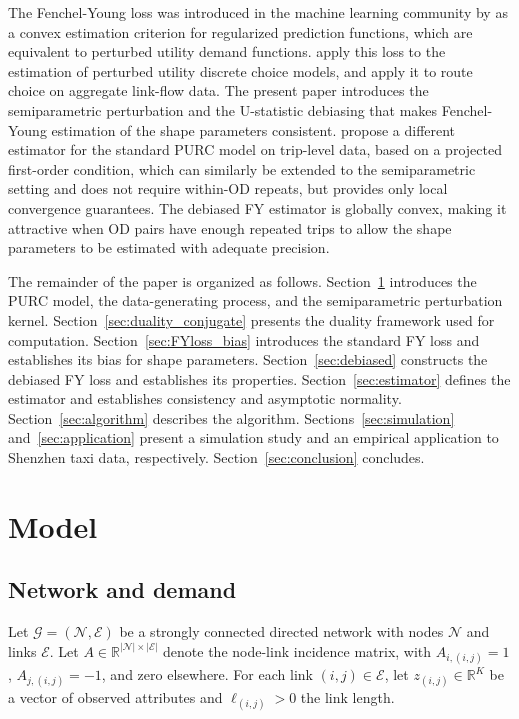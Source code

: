 \documentclass[12pt]{article}
\newcommand{\cG}{\mathcal{G}}
\newcommand{\cN}{\mathcal{N}}
\newcommand{\cE}{\mathcal{E}}
\begin{document}
The Fenchel-Young loss was introduced in the machine learning community by \citet{blondel_learning_2020} as a convex estimation criterion for regularized prediction functions, which are equivalent to perturbed utility demand functions. \citet{lin_fenchel-young_2026} apply this loss to the estimation of perturbed utility discrete choice models, and \citet{yin_fenchel-young_2026} apply it to route choice on aggregate link-flow data.
The present paper introduces the semiparametric perturbation and the U-statistic debiasing that makes Fenchel-Young estimation of the shape parameters consistent. \citet{fosgerau_estimating_2024} propose a different estimator for the standard PURC model on trip-level data, based on a projected first-order condition, which can similarly be extended to the semiparametric setting and does not require within-OD repeats, but provides only local convergence guarantees. The debiased FY estimator is globally convex, making it attractive when OD pairs have enough repeated trips to allow the shape parameters to be estimated with adequate precision. 

The remainder of the paper is organized as follows. Section~\ref{sec:model} introduces the PURC model, the data-generating process, and the semiparametric perturbation kernel. Section~\ref{sec:duality_conjugate} presents the duality framework used for computation. Section~\ref{sec:FYloss_bias} introduces the standard FY loss and establishes its bias for shape parameters. Section~\ref{sec:debiased} constructs the debiased FY loss and establishes its properties. Section~\ref{sec:estimator} defines the estimator and establishes consistency and asymptotic normality. Section~\ref{sec:algorithm} describes the algorithm. Sections~\ref{sec:simulation} and~\ref{sec:application} present a simulation study and an empirical application to Shenzhen taxi data, respectively. Section~\ref{sec:conclusion} concludes.

\section{Model}\label{sec:model}

\subsection{Network and demand}

Let $\cG = (\cN, \cE)$ be a strongly connected directed network with nodes $\cN$ and links $\cE$. Let $A \in \mathbb{R}^{|\cN| \times |\cE|}$ denote the node-link incidence matrix, with $A_{i,(i,j)} = 1$, $A_{j,(i,j)} = -1$, and zero elsewhere. For each link $(i,j) \in \cE$, let $z_{(i,j)} \in \mathbb{R}^K$ be a vector of observed attributes and $\ell_{(i,j)} > 0$ the link length.
\end{document}
